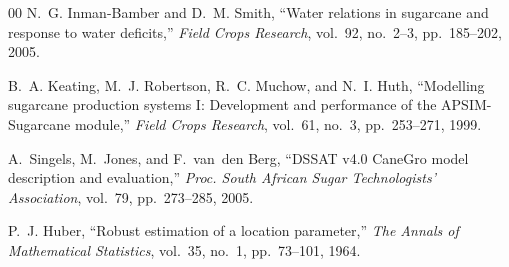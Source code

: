 \documentclass[conference,10pt,letterpaper]{IEEEtran}
\begin{document}
\begin{thebibliography}{00}
N.~G. Inman-Bamber and D.~M. Smith,
``Water relations in sugarcane and response to water deficits,''
\emph{Field Crops Research}, vol.~92, no.~2--3, pp.~185--202, 2005.

B.~A. Keating, M.~J. Robertson, R.~C. Muchow, and N.~I. Huth,
``Modelling sugarcane production systems I: Development and performance
of the APSIM-Sugarcane module,''
\emph{Field Crops Research}, vol.~61, no.~3, pp.~253--271, 1999.

A.~Singels, M.~Jones, and F.~van~den Berg,
``DSSAT v4.0 CaneGro model description and evaluation,''
\emph{Proc. South African Sugar Technologists' Association},
vol.~79, pp.~273--285, 2005.

P.~J. Huber,
``Robust estimation of a location parameter,''
\emph{The Annals of Mathematical Statistics}, vol.~35, no.~1, pp.~73--101, 1964.

\end{thebibliography}
\end{document}

